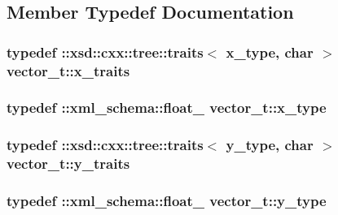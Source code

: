 \subsection{Member Typedef Documentation}
\subsubsection[{\texorpdfstring{x\+\_\+traits}{x_traits}}]{\setlength{\rightskip}{0pt plus 5cm}typedef \+::xsd\+::cxx\+::tree\+::traits$<$ {\bf x\+\_\+type}, char $>$ {\bf vector\+\_\+t\+::x\+\_\+traits}}\hypertarget{classvector__t_ae5816c2392b8a96d1f1b44725329edef}{}\label{classvector__t_ae5816c2392b8a96d1f1b44725329edef}
\subsubsection[{\texorpdfstring{x\+\_\+type}{x_type}}]{\setlength{\rightskip}{0pt plus 5cm}typedef \+::{\bf xml\+\_\+schema\+::float\+\_\+} {\bf vector\+\_\+t\+::x\+\_\+type}}\hypertarget{classvector__t_a3e09c311dbbdc507b68a2f3fa0c3d25b}{}\label{classvector__t_a3e09c311dbbdc507b68a2f3fa0c3d25b}
\subsubsection[{\texorpdfstring{y\+\_\+traits}{y_traits}}]{\setlength{\rightskip}{0pt plus 5cm}typedef \+::xsd\+::cxx\+::tree\+::traits$<$ {\bf y\+\_\+type}, char $>$ {\bf vector\+\_\+t\+::y\+\_\+traits}}\hypertarget{classvector__t_a62b2a4701ddd5ad8548e19b50dbce8bb}{}\label{classvector__t_a62b2a4701ddd5ad8548e19b50dbce8bb}
\subsubsection[{\texorpdfstring{y\+\_\+type}{y_type}}]{\setlength{\rightskip}{0pt plus 5cm}typedef \+::{\bf xml\+\_\+schema\+::float\+\_\+} {\bf vector\+\_\+t\+::y\+\_\+type}}\hypertarget{classvector__t_ab24cc76c51c8a32d39f97d1b4f8ddc5c}{}\label{classvector__t_ab24cc76c51c8a32d39f97d1b4f8ddc5c}
